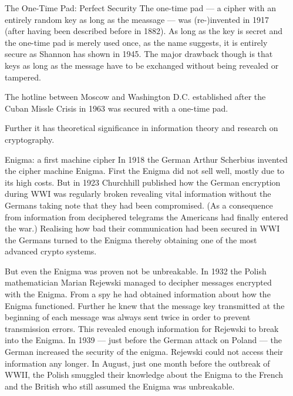\documentclass[final,hyperref={pdfpagelabels=false}]{beamer}
\begin{document}
\begin{frame}{}
\begin{columns}[t]
\begin{column}{.3\linewidth}
    \end{column}
    \begin{column}{.3\linewidth}
        \begin{block}{The One-Time Pad: Perfect Security}
          The one-time pad --- a cipher with an entirely random key as long as the meassage --- was (re-)invented in 1917 (after having been described before in 1882). As long as the key is secret and the one-time pad is merely used once, as the name suggests, it is entirely secure as Shannon has shown in 1945. The major drawback though is that keys as long as the message have to be exchanged without being revealed or tampered. \par
          The hotline between Moscow and Washington D.C. established after the Cuban Missle Crisis in 1963 was secured with a one-time pad. \par
          Further it has theoretical significance in information theory and research on cryptography.
        \end{block}
        \begin{block}{Enigma: a first machine cipher}
          In  1918 the German Arthur Scherbius invented the cipher machine Enigma. First the Enigma did not sell well, mostly due to its high costs. But in 1923 Churchhill published how the German encryption during WWI was regularly broken revealing vital information without the Germans taking note that they had been compromised. (As a consequence from information from deciphered telegrams the Americans had finally entered the war.) Realising how bad their communication had been secured in WWI the Germans turned to the Enigma thereby obtaining one of the most advanced crypto systems. \par
          But even the Enigma was proven not be unbreakable. In 1932 the Polish mathematician Marian Rejewski managed to decipher messages encrypted with the Enigma. From a spy he had obtained information about how the Enigma functioned. Further he knew that the message key transmitted at the beginning of each message was always sent twice in order to prevent transmission errors. This revealed enough information for Rejewski to break into the Enigma. In 1939 --- just before the German attack on Poland --- the German  increased the security of the enigma. Rejewski could not access their information any longer. In August, just one month before the outbreak of WWII, the Polish smuggled their knowledge about the Enigma to the French and the British who still assumed the Enigma was unbreakable. \par

\end{block}
\end{column}
\end{columns}
\end{frame}
\end{document}
